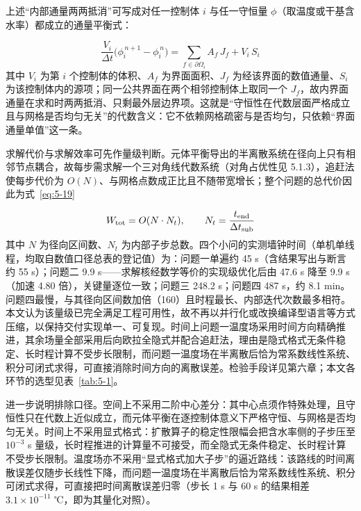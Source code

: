 上述“内部通量两两抵消”可写成对任一控制体 $i$ 与任一守恒量 $\phi$（取温度或干基含水率）都成立的通量平衡式：

\begin{equation}
  \frac{V_i}{\Delta t}\big(\phi_i^{\,n+1}-\phi_i^{\,n}\big)=\sum_{f\in\partial\Omega_i}A_f\,J_f+V_i\,S_i
  \label{eq:5-18}
\end{equation}
其中 $V_i$ 为第 $i$ 个控制体的体积、$A_f$ 为界面面积、$J_f$ 为经该界面的数值通量、$S_i$ 为该控制体内的源项；同一公共界面在两个相邻控制体上取同一个 $J_f$，故内界面通量在求和时两两抵消、只剩最外层边界项。这就是“守恒性在代数层面严格成立且与网格是否均匀无关”的代数含义：它不依赖网格疏密与是否均匀，只依赖“界面通量单值”这一条。

求解代价与求解效率可先作量级判断。元体平衡导出的半离散系统在径向上只有相邻节点耦合，故每步需求解一个三对角线代数系统（对角占优性见 5.1.3），追赶法使每步代价为 $O(N)$、与网格点数成正比且不随带宽增长；整个问题的总代价因此为式~\eqref{eq:5-19}

\begin{equation}
  W_{\rm tot}=O(N\cdot N_t),\qquad N_t=\frac{t_{\rm end}}{\Delta t_{\rm sub}}
  \label{eq:5-19}
\end{equation}
其中 $N$ 为径向区间数、$N_t$ 为内部子步总数。四个小问的实测墙钟时间（单机单线程，均取自数值口径总表的登记值）为：问题一单遍约 45 s（含结果写出与断言约 55 s）；问题二 9.9 s——求解核经数学等价的实现级优化后由 47.6 s 降至 9.9 s（加速 4.80 倍），关键量逐位一致；问题三 248.2 s；问题四 487 s，约 8.1 min。问题四最慢，与其径向区间数加倍（160）且时程最长、内部迭代次数最多相符。本文认为该量级已完全满足工程可用性，故不再以并行化或改换编译型语言等方式压缩，以保持交付实现单一、可复现。时间上问题一温度场采用时间方向精确推进，其余场量全部采用后向欧拉全隐式并配合追赶法，理由是隐式格式无条件稳定、长时程计算不受步长限制，而问题一温度场在半离散后恰为常系数线性系统、积分可闭式求得，可直接消除时间方向的离散误差。检验手段详见第六章；本文各环节的选型见表~\ref{tab:5-1}。

进一步说明排除口径。空间上不采用二阶中心差分：其中心点须作特殊处理，且守恒性只在代数上近似成立，而元体平衡在逐控制体意义下严格守恒、与网格是否均匀无关。时间上不采用显式格式：扩散算子的稳定性限幅会把含水率侧的子步压至 $10^{-3}$ s 量级，长时程推进的计算量不可接受，而全隐式无条件稳定、长时程计算不受步长限制。温度场亦不采用“显式格式加大子步”的逼近路线：该路线的时间离散误差仅随步长线性下降，而问题一温度场在半离散后恰为常系数线性系统、积分可闭式求得，可直接把时间离散误差归零（步长 1 s 与 60 s 的结果相差 $3.1\times10^{-11}$ ℃，即为其量化对照）。



